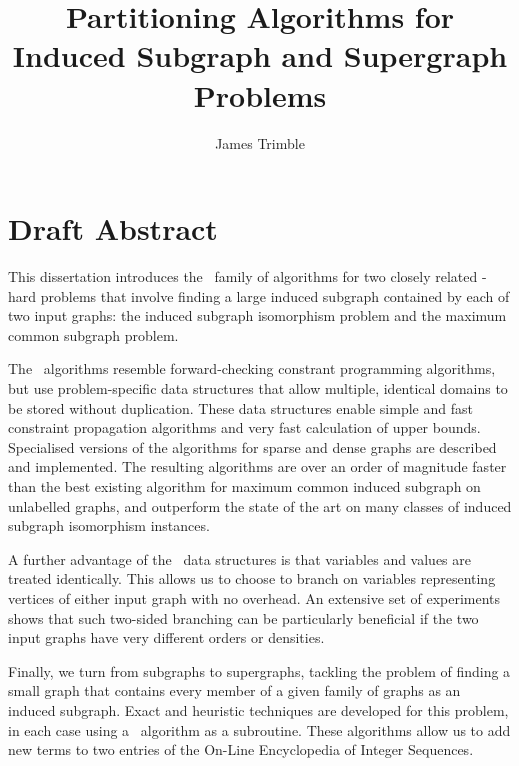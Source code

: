 \documentclass[notitlepage]{report}
\title{Partitioning Algorithms for Induced Subgraph and Supergraph Problems}
\author{James Trimble}
\newcommand{\McSplit}{\textproc{McSplit}}
\begin{document}
\maketitle
\thispagestyle{empty}

\section*{Draft Abstract}

This dissertation introduces the \McSplit\ family of algorithms for two
    closely related \NP-hard problems that involve finding a large induced
    subgraph contained by each of two input graphs: the induced subgraph
    isomorphism problem and the maximum common subgraph problem.

The \McSplit\ algorithms resemble forward-checking constrant programming
algorithms, but use problem-specific data structures that allow
multiple, identical domains to be stored without duplication.  These data structures
enable simple and fast constraint propagation algorithms and very fast calculation of
upper bounds.  Specialised versions of the algorithms for sparse and dense graphs are
described and implemented.
The resulting algorithms are over an order of magnitude faster
than the best existing algorithm for maximum common induced subgraph on unlabelled
graphs, and outperform the state of the art on many classes of induced subgraph
isomorphism instances.

A further advantage of the \McSplit\ data structures is that variables and
values are treated identically. This allows us to choose to branch on variables
representing vertices of either input graph with no overhead.  An extensive
set of experiments shows that such two-sided branching can be particularly
beneficial if the two input graphs have very different orders or densities.

Finally, we turn from subgraphs to supergraphs, tackling the problem of
finding a small graph that contains every member of a given family of graphs
as an induced subgraph.  Exact and heuristic techniques are developed for
this problem, in each case using a \McSplit\ algorithm as a subroutine.
These algorithms allow us to add new terms to two entries of the
On-Line Encyclopedia of Integer Sequences.
\end{document}
